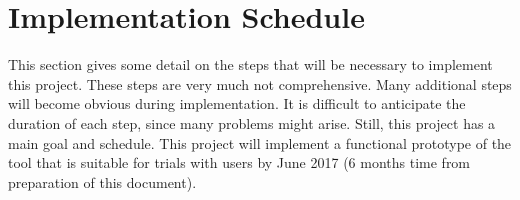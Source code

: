 

\section{Implementation Schedule}

This section gives some detail on the steps that will be necessary to implement this project.
These steps are very much not comprehensive.
Many additional steps will become obvious during implementation.
It is difficult to anticipate the duration of each step, since many problems might arise.
Still, this project has a main goal and schedule.
This project will implement a functional prototype of the tool that is suitable for trials with users by June 2017 (6 months time from preparation of this document).

